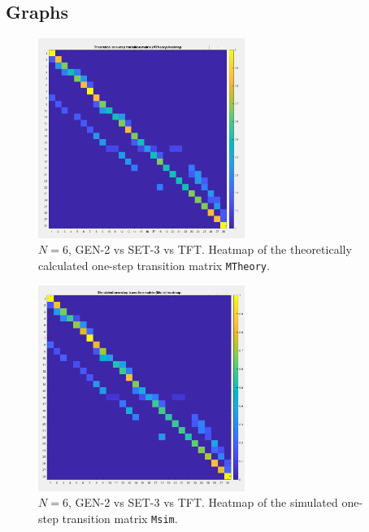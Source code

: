 \documentclass[12pt]{report}
\begin{document}
\newpage
\subsection{Graphs}


\begin{figure}[h!]
    \centering
    \includegraphics[width=0.6\textwidth]{A1-MTheoryHeatmap.png}
    \caption{$N=6$, GEN-2 vs SET-3 vs TFT. Heatmap of the theoretically calculated one-step transition matrix \texttt{MTheory}.}
    \label{A1}
\end{figure}

\begin{figure}[h!]
    \centering
    \includegraphics[width=0.6\textwidth]{A2-MsimHeatmap.png}
    \caption{$N=6$, GEN-2 vs SET-3 vs TFT. Heatmap of the simulated one-step transition matrix \texttt{Msim}.}
    \label{A2}
\end{figure}
\end{document}
